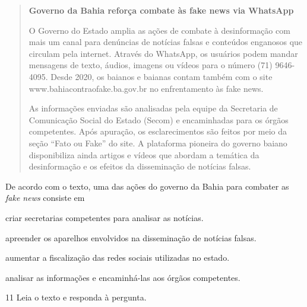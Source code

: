\begin{quote}
\textbf{Governo da Bahia reforça combate às fake news via WhatsApp}

O Governo do Estado amplia as ações de combate à desinformação com mais
um canal para denúncias de notícias falsas e conteúdos enganosos que
circulam pela internet. Através do WhatsApp, os usuários podem mandar
mensagens de texto, áudios, imagens ou vídeos para o número (71)
9646-4095. Desde 2020, os baianos e baianas contam também com o site
www.bahiacontraofake.ba.gov.br no enfrentamento às fake news.

As informações enviadas são analisadas pela equipe da Secretaria de
Comunicação Social do Estado (Secom) e encaminhadas para os órgãos
competentes. Após apuração, os esclarecimentos são feitos por meio da
seção ``Fato ou Fake'' do site. A plataforma pioneira do governo baiano
disponibiliza ainda artigos e vídeos que abordam a temática da
desinformação e os efeitos da disseminação de notícias falsas.

\end{quote}

De acordo com o texto, uma das ações do governo da Bahia para combater
as \textit{fake news} consiste em

\begin{escolha}

  \item criar secretarias competentes para analisar as notícias.

  \item apreender os aparelhos envolvidos na disseminação de notícias
falsas.

  \item aumentar a fiscalização das redes sociais utilizadas no estado.

  \item analisar as informações e encaminhá-las aos órgãos competentes.
\end{escolha}



\num{11} Leia o texto e responda à pergunta.

